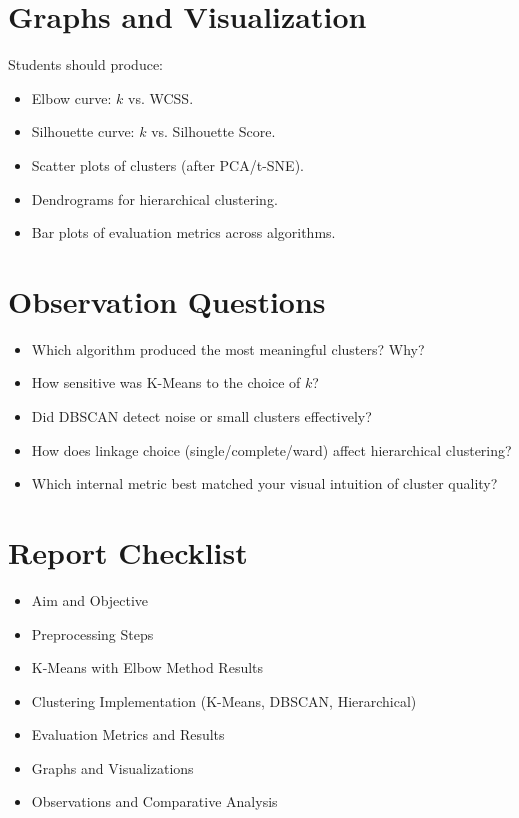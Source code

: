 \documentclass[11pt]{article}
\begin{document}
\section*{Graphs and Visualization}
Students should produce:
\begin{itemize}
    \item Elbow curve: $k$ vs. WCSS.
    \item Silhouette curve: $k$ vs. Silhouette Score.
    \item Scatter plots of clusters (after PCA/t-SNE).
    \item Dendrograms for hierarchical clustering.
    \item Bar plots of evaluation metrics across algorithms.
\end{itemize}

\section*{Observation Questions}
\begin{itemize}
    \item Which algorithm produced the most meaningful clusters? Why?
    \item How sensitive was K-Means to the choice of $k$?
    \item Did DBSCAN detect noise or small clusters effectively?
    \item How does linkage choice (single/complete/ward) affect hierarchical clustering?
    \item Which internal metric best matched your visual intuition of cluster quality?
\end{itemize}

\section*{Report Checklist}
\begin{itemize}
    \item Aim and Objective
    \item Preprocessing Steps
    \item K-Means with Elbow Method Results
    \item Clustering Implementation (K-Means, DBSCAN, Hierarchical)
    \item Evaluation Metrics and Results
    \item Graphs and Visualizations
    \item Observations and Comparative Analysis
\end{itemize}
\end{document}
